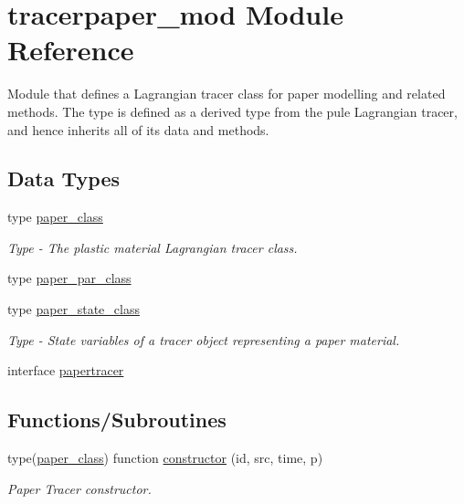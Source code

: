 \hypertarget{namespacetracerpaper__mod}{}\section{tracerpaper\+\_\+mod Module Reference}
\label{namespacetracerpaper__mod}


Module that defines a Lagrangian tracer class for paper modelling and related methods. The type is defined as a derived type from the pule Lagrangian tracer, and hence inherits all of it\textquotesingle{}s data and methods.  


\subsection*{Data Types}
\begin{DoxyCompactItemize}
\item 
type \mbox{\hyperlink{structtracerpaper__mod_1_1paper__class}{paper\+\_\+class}}
\begin{DoxyCompactList}\small\item\em Type -\/ The plastic material Lagrangian tracer class. \end{DoxyCompactList}\item 
type \mbox{\hyperlink{structtracerpaper__mod_1_1paper__par__class}{paper\+\_\+par\+\_\+class}}
\item 
type \mbox{\hyperlink{structtracerpaper__mod_1_1paper__state__class}{paper\+\_\+state\+\_\+class}}
\begin{DoxyCompactList}\small\item\em Type -\/ State variables of a tracer object representing a paper material. \end{DoxyCompactList}\item 
interface \mbox{\hyperlink{interfacetracerpaper__mod_1_1papertracer}{papertracer}}
\end{DoxyCompactItemize}
\subsection*{Functions/\+Subroutines}
\begin{DoxyCompactItemize}
\item 
type(\mbox{\hyperlink{structtracerpaper__mod_1_1paper__class}{paper\+\_\+class}}) function \mbox{\hyperlink{namespacetracerpaper__mod_ad1bbc9d4e889b6aab71f0333cf6a5365}{constructor}} (id, src, time, p)
\begin{DoxyCompactList}\small\item\em Paper Tracer constructor. \end{DoxyCompactList}\end{DoxyCompactItemize}


